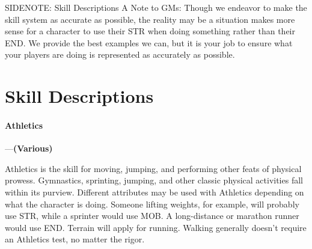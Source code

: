 \documentclass[oneside,11pt,english]{book}
\begin{document}
SIDENOTE: Skill Descriptions %
A Note to GMs: Though we endeavor to make the skill system as accurate as possible, the reality may be 
a situation makes more sense for a character to use their STR when doing something rather than their 
END. We provide the best examples we can, but it is your job to ensure what your players are doing is 
represented as accurately as possible. 

\section{Skill Descriptions}
\paragraph{\label{skill:Athletics}Athletics}---\quad\textbf{(Various)}\par
Athletics is the skill for moving, jumping, and performing other feats of physical prowess. Gymnastics, sprinting, jumping, and other classic physical activities fall within its purview. Different attributes may be used with Athletics depending on what the character is doing. Someone lifting weights, for example, will probably use STR, while a sprinter would use MOB. A long-distance or marathon runner would use END. Terrain will apply for running. Walking generally doesn’t require an Athletics test, no matter the rigor.
\end{document}
